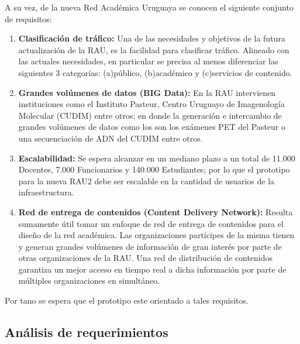 A su vez, de la nueva Red Académica Uruguaya se conocen el siguiente conjunto de requisitos:


\begin{enumerate}
\item \textbf{Clasificación de tráfico:} Una de las necesidades y objetivos de la futura actualizaci\'on de la RAU, es la facilidad para clasificar tráfico. Alineado con las actuales necesidades, en particular se precisa al menos diferenciar las siguientes 3 categorías: (a)público, (b)académico y (c)servicios de contenido.

\item \textbf{Grandes volúmenes de datos (BIG Data):} En la RAU intervienen instituciones como el Instituto Pasteur, Centro Uruguayo de Imagenología Molecular (CUDIM) entre otros; en donde la generación e intercambio de grandes volúmenes de datos como los son los exámenes PET del Pasteur o una secuenciación de ADN del CUDIM entre otros.

\item \textbf{Escalabilidad:} Se espera alcanzar en un mediano plazo a un total de 11.000 Docentes, 7.000 Funcionarios y 140.000 Estudiantes; por lo que el prototipo para la nueva RAU2 debe ser escalable en la cantidad de usuarios de la infraestructura.

\item \textbf{Red de entrega de contenidos (Content Delivery Network):} Resulta sumamente útil tomar un enfoque de red de entrega de contenidos para el diseño de la red académica. Las organizaciones partícipes de la misma tienen y generan grandes volúmenes de información de gran interés por parte de otras organizaciones de la RAU. Una red de distribución de contenidos garantiza un mejor acceso en tiempo real a dicha información por parte de múltiples organizaciones en simultáneo. 
 
\end{enumerate}

Por tano se espera que el prototipo este orientado a tales requisitos.

\newpage
\subsection[An\'alisis de requerimientos]{An\'alisis de requerimientos}

